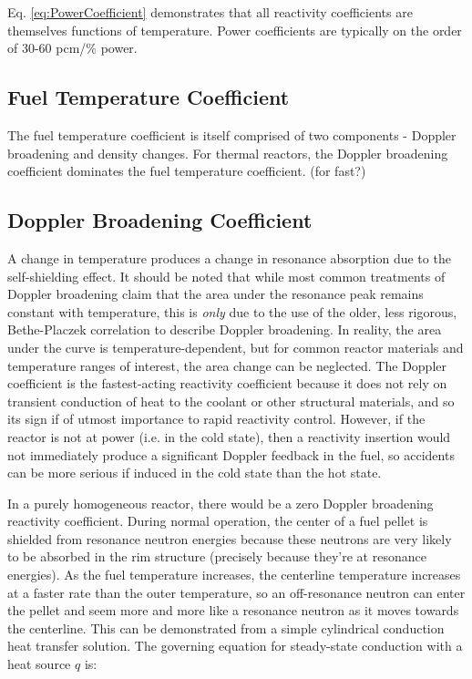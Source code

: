 \documentclass[10pt]{article}
\begin{document}
\begin{flushleft}
Eq. \ref{eq:PowerCoefficient} demonstrates that all reactivity coefficients are themselves functions of temperature. Power coefficients are typically on the order of 30-60 pcm/\% power.

\subsection{Fuel Temperature Coefficient}

The fuel temperature coefficient is itself comprised of two components - Doppler broadening and density changes. For thermal reactors, the Doppler broadening coefficient dominates the fuel temperature coefficient. (for fast?)

\subsection{Doppler Broadening Coefficient}

A change in temperature produces a change in resonance absorption due to the self-shielding effect. It should be noted that while most common treatments of Doppler broadening claim that the area under the resonance peak remains constant with temperature, this is \textit{only} due to the use of the older, less rigorous, Bethe-Placzek correlation to describe Doppler broadening. In reality, the area under the curve is temperature-dependent, but for common reactor materials and temperature ranges of interest, the area change can be neglected. The Doppler coefficient is the fastest-acting reactivity coefficient because it does not rely on transient conduction of heat to the coolant or other structural materials, and so its sign if of utmost importance to rapid reactivity control. However, if the reactor is not at power (i.e. in the cold state), then a reactivity insertion would not immediately produce a significant Doppler feedback in the fuel, so accidents can be more serious if induced in the cold state than the hot state. 

In a purely homogeneous reactor, there would be a zero Doppler broadening reactivity coefficient. During normal operation, the center of a fuel pellet is shielded from resonance neutron energies because these neutrons are very likely to be absorbed in the rim structure (precisely because they're at resonance energies). As the fuel temperature increases, the centerline temperature increases at a faster rate than the outer temperature, so an off-resonance neutron can enter the pellet and seem more and more like a resonance neutron as it moves towards the centerline. This can be demonstrated from a simple cylindrical conduction heat transfer solution. The governing equation for steady-state conduction with a heat source \(q\) is:


\end{flushleft}
\end{document}
